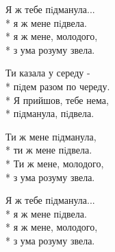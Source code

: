 \medskip

\begin{minipage}{\linewidth}
\hspace*{1.5em}Я ж тебе пiдманула...\\*
\hspace*{1.5em}я ж мене пiдвела.\\*
\hspace*{1.5em}я ж мене, молодого,\\*
\hspace*{1.5em}з ума розуму звела.\\
\end{minipage}\par\medskip\nobreak

\medskip

\begin{minipage}{\linewidth}
Ти казала у середу -\\*
пiдем разом по череду.\\*
Я прийшов, тебе нема,\\*
пiдманула, пiдвела.\\
\end{minipage}\par\medskip\nobreak

\medskip

\begin{minipage}{\linewidth}
\hspace*{1.5em}Ти ж мене пiдманула,\\*
\hspace*{1.5em}ти ж мене пiдвела.\\*
\hspace*{1.5em}Ти ж мене, молодого,\\*
\hspace*{1.5em}з ума розуму звела.\\
\end{minipage}\par\medskip\nobreak

\medskip

\begin{minipage}{\linewidth}
\hspace*{1.5em}Я ж тебе пiдманула...\\*
\hspace*{1.5em}я ж мене пiдвела.\\*
\hspace*{1.5em}я ж мене, молодого,\\*
\hspace*{1.5em}з ума розуму звела.\\
\end{minipage}\par\medskip\nobreak


